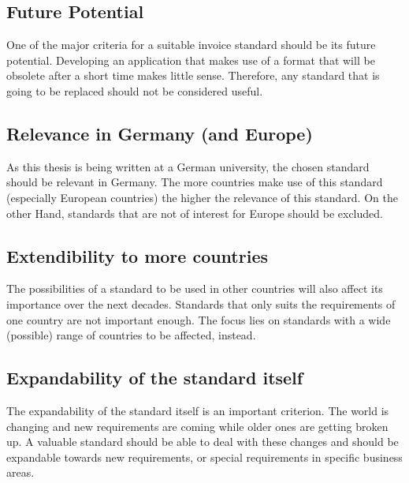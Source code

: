 \subsection{Future Potential}
\label{sec2.2.1}
One of the major criteria for a suitable invoice standard should be its future potential. Developing an application that makes use of a format that will be obsolete after a short time makes little sense. Therefore, any standard that is going to be replaced should not be considered useful.

\subsection{Relevance in Germany (and Europe)}
\label{sec2.2.2}
As this thesis is being written at a German university, the chosen standard should be relevant in Germany. The more countries make use of this standard (especially European countries) the higher the relevance of this standard. On the other Hand, standards that are not of interest for Europe should be excluded.

\subsection{Extendibility to more countries}
\label{sec2.2.3}
The possibilities of a standard to be used in other countries will also affect its importance over the next decades. Standards that only suits the requirements of one country are not important enough. The focus lies on standards with a wide (possible) range of countries to be affected, instead.

\subsection{Expandability of the standard itself}
\label{sec2.2.4}
The expandability of the standard itself is an important criterion. The world is changing and new requirements are coming while older ones are getting broken up. A valuable standard should be able to deal with these changes and should be expandable towards new requirements, or special requirements in specific business areas.

